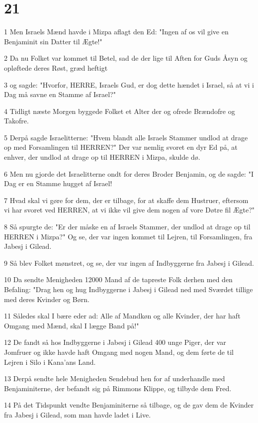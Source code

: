 \chapter{21}

\par 1 Men Israels Mænd havde i Mizpa aflagt den Ed: "Ingen af os vil give en Benjaminit sin Datter til Ægte!"
\par 2 Da nu Folket var kommet til Betel, sad de der lige til Aften for Guds Åsyn og opløftede deres Røst, græd heftigt
\par 3 og sagde: "Hvorfor, HERRE, Israels Gud, er dog dette hændet i Israel, så at vi i Dag må savne en Stamme af Israel?"
\par 4 Tidligt næste Morgen byggede Folket et Alter der og ofrede Brændofre og Takofre.
\par 5 Derpå sagde Israelitterne: "Hvem blandt alle Israels Stammer undlod at drage op med Forsamlingen til HERREN?" Der var nemlig svoret en dyr Ed på, at enhver, der undlod at drage op til HERREN i Mizpa, skulde dø.
\par 6 Men nu gjorde det Israelitterne ondt for deres Broder Benjamin, og de sagde: "I Dag er en Stamme hugget af Israel!
\par 7 Hvad skal vi gøre for dem, der er tilbage, for at skaffe dem Hustruer, eftersom vi har svoret ved HERREN, at vi ikke vil give dem nogen af vore Døtre fil Ægte?"
\par 8 Så spurgte de: "Er der måske en af Israels Stammer, der undlod at drage op til HERREN i Mizpa?" Og se, der var ingen kommet til Lejren, til Forsamlingen, fra Jabesj i Gilead.
\par 9 Så blev Folket mønstret, og se, der var ingen af Indbyggerne fra Jabesj i Gilead.
\par 10 Da sendte Menigheden 12000 Mand af de tapreste Folk derhen med den Befaling: "Drag hen og hug Indbyggerne i Jabesj i Gilead ned med Sværdet tillige med deres Kvinder og Børn.
\par 11 Således skal I bære eder ad: Alle af Mandkøn og alle Kvinder, der har haft Omgang med Mænd, skal I lægge Band på!"
\par 12 De fandt så hos Indbyggerne i Jabesj i Gilead 400 unge Piger, der var Jomfruer og ikke havde haft Omgang med nogen Mand, og dem førte de til Lejren i Silo i Kana'ans Land.
\par 13 Derpå sendte hele Menigheden Sendebud hen for af underhandle med Benjaminiterne, der befandt sig på Rimmons Klippe, og tilbyde dem Fred.
\par 14 På det Tidspunkt vendte Benjaminiterne så tilbage, og de gav dem de Kvinder fra Jabesj i Gilead, som man havde ladet i Live.
